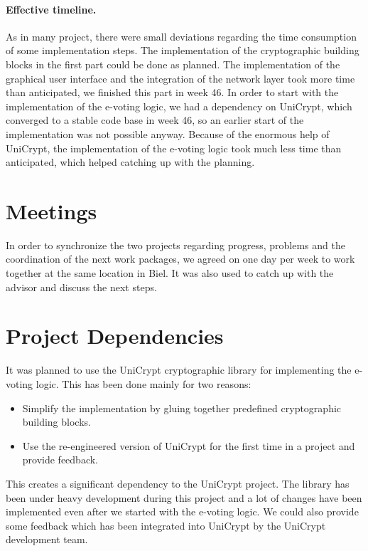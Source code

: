 \documentclass[numbers=noenddot, abstract=on, a4paper, headsepline,
footsepline, oneside, openright, draft=off, listof=leveldown]{scrreprt}
\begin{document}
\paragraph{Effective timeline.} As in many project, there were small deviations
regarding the time consumption of some implementation steps. The implementation
of the cryptographic building blocks in the first part could be done as planned.
The implementation of the graphical user interface and the integration of the
network layer took more time than anticipated, we finished this part in week 46.
In order to start with the implementation of the e-voting logic, we had a
dependency on UniCrypt, which converged to a stable code base in week 46, so an
earlier start of the implementation was not possible anyway. Because of the
enormous help of UniCrypt, the implementation of the e-voting logic took much
less time than anticipated, which helped catching up with the planning.

\section{Meetings}
In order to synchronize the two projects regarding progress, problems and the
coordination of the next work packages, we agreed on one day per week to 
work together at the same location in Biel. It was also used to catch up with
the advisor and discuss the next steps.

\section{Project Dependencies}
It was planned to use the UniCrypt cryptographic library for implementing the
e-voting logic. This has been done mainly for two reasons:
\begin{itemize}
  \item Simplify the implementation by gluing together predefined cryptographic
  building blocks.
  \item Use the re-engineered version of UniCrypt for the first time in a
  project and provide feedback.
\end{itemize}
This creates a significant dependency to the UniCrypt project. The library has
been under heavy development during this project and a lot of changes have been
implemented even after we started with the e-voting logic. We could also provide
some feedback which has been integrated into UniCrypt by the UniCrypt
development team.
\end{document}

